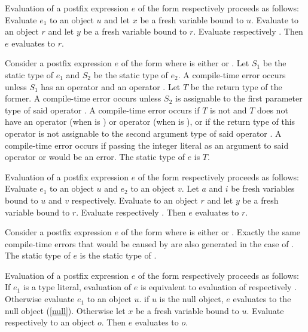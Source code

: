 \documentclass[makeidx]{article}
\begin{document}
{\LMHash{}%
Evaluation of a postfix expression $e$
of the form  respectively 
proceeds as follows:
Evaluate $e_1$ to an object $u$ and let $x$ be a fresh variable bound to $u$.
Evaluate  to an object $r$
and let $y$ be a fresh variable bound to $r$.
Evaluate  respectively .
Then $e$ evaluates to $r$.
\EndCase

\LMHash{}%
Consider a postfix expression $e$ of the form 
where \op{} is either \lit{++} or \lit{-{}-}.
Let $S_1$ be the static type of $e_1$
and $S_2$ be the static type of $e_2$.
A compile-time error occurs unless $S_1$ has
an operator \lit{[]} and an operator \lit{[]=}.
Let $T$ be the return type of the former.
A compile-time error occurs unless $S_2$ is assignable to
the first parameter type of said operator \lit{[]=}.
A compile-time error occurs if $T$ is not \DYNAMIC{}
and $T$ does not have an operator \lit{+} (when \op{} is \lit{++})
or operator \lit{-} (when \op{} is \lit{-{}-}),
or if the return type of this operator is not assignable to
the second argument type of said operator \lit{[]=}.
A compile-time error occurs if passing the integer literal 
as an argument to said operator \lit{+} or \lit{-} would be an error.
The static type of $e$ is $T$.

\LMHash{}%
Evaluation of a postfix expression $e$
of the form  respectively 
proceeds as follows:
Evaluate $e_1$ to an object $u$ and $e_2$ to an object $v$.
Let $a$ and $i$ be fresh variables bound to $u$ and $v$ respectively.
Evaluate  to an object $r$
and let $y$ be a fresh variable bound to $r$.
Evaluate  respectively .
Then $e$ evaluates to $r$.
\EndCase

\LMHash{}%
Consider a postfix expression $e$ of the form 
where \op{} is either \lit{++} or \lit{-{}-}.
Exactly the same compile-time errors that would be caused by
are also generated in the case of .
The static type of $e$ is the static type of .

\LMHash{}%
Evaluation of a postfix expression $e$
of the form  respectively 
proceeds as follows:
If $e_1$ is a type literal, evaluation of $e$ is equivalent to
evaluation of  respectively .
Otherwise evaluate $e_1$ to an object $u$.
if $u$ is the null object, $e$ evaluates to the null object (\ref{null}).
Otherwise let $x$ be a fresh variable bound to $u$.
Evaluate  respectively  to an object $o$.
Then $e$ evaluates to $o$.
\EndCase


}
\end{document}
